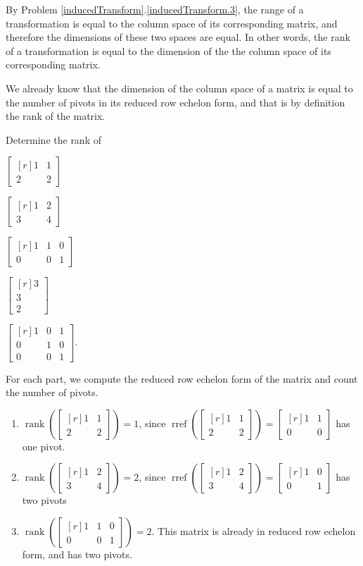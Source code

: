 \documentclass{problemset}
\DeclareMathOperator{\Rref}{rref}
\DeclareMathOperator{\Rank}{rank}
\newcommand{\rref}{\Rref}
\newcommand{\mat}[1]{\begin{bmatrix*}[r]#1\end{bmatrix*}}
\begin{document}
\begin{parts}
\begin{solution}
				By Problem \ref{inducedTransform}.\ref{inducedTransform.3}, the 
				range of a transformation is equal to the column space of its 
				corresponding matrix, and therefore the dimensions of these two
				spaces are equal. In other words, the rank of a transformation is
				equal to the dimension of the the column space of its corresponding 
				matrix. 

				We already know that the dimension of the column space of a matrix
				is equal to the number of pivots in its reduced row echelon form,
				and that is by definition the rank of the matrix.
			\end{solution}
	\end{parts}


	\question
	\begin{parts}
		\item Determine the rank of
		\begin{enumerate*}
			\item $\mat{1&1\\2&2}$
			\item $\mat{1&2\\3&4}$
			\item $\mat{1&1&0\\0&0&1}$
			\item $\mat{3\\3\\2}$
			\item $\mat{1&0&1\\0&1&0\\0&0&1}$.
		\end{enumerate*}
		\begin{solution}
			For each part, we compute the reduced row echelon form of the matrix
			and count the number of pivots.
			\begin{enumerate}
				\item $\Rank\left(\mat{1&1\\2&2}\right)=1$, since 
					$\rref\left(\mat{1&1\\2&2}\right)=\mat{1&1\\0&0}$ has one pivot.
				\item $\Rank\left(\mat{1&2\\3&4}\right)=2$, since 
					$\rref\left(\mat{1&2\\3&4}\right)=\mat{1&0\\0&1}$ has two pivots
				\item $\Rank\left(\mat{1&1&0\\0&0&1}\right)=2$.
					This matrix is already in reduced row echelon form, and has two pivots.

\end{enumerate}
\end{solution}
\end{parts}
\end{document}
